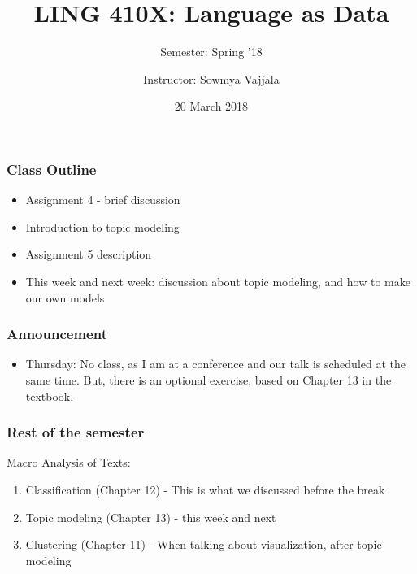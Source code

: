 \documentclass{beamer}
\author[Sowmya Vajjala]{Instructor: Sowmya Vajjala}
\title[LING 410X]{LING 410X: Language as Data}
\subtitle{Semester: Spring '18}
\date{20 March 2018}
\institute{Iowa State University, USA}
\begin{document}
\begin{frame}\titlepage
\end{frame}

\begin{frame}
\frametitle{Class Outline}
\begin{itemize}
\item Assignment 4 - brief discussion
\item Introduction to topic modeling
\item Assignment 5 description
\item This week and next week: discussion about topic modeling, and how to make our own models
\end{itemize} 
\end{frame}

\begin{frame}
\frametitle{Announcement}
\begin{itemize}
\item Thursday: No class, as I am at a conference and our talk is scheduled at the same time. But, there is an optional exercise, based on Chapter 13 in the textbook.
\end{itemize}
\end{frame}

\begin{frame}
\frametitle{Rest of the semester}
Macro Analysis of Texts:
\begin{enumerate}
\item Classification (Chapter 12) - This is what we discussed before the break
\item Topic modeling (Chapter 13) - this week and next
\item Clustering (Chapter 11) - When talking about visualization, after topic modeling
\end{enumerate}
\end{frame}
\end{document}
